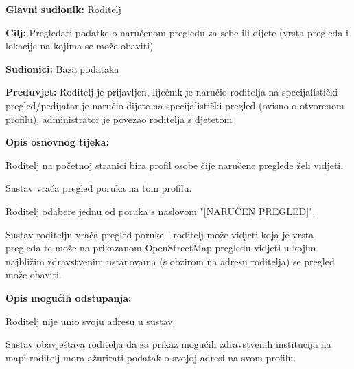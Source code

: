 					
						\noindent {}
					\begin{packed_item}
						
						\item \textbf{Glavni sudionik: }Roditelj
						\item  \textbf{Cilj:} Pregledati podatke o naručenom pregledu za sebe ili dijete (vrsta pregleda i lokacije na kojima se može obaviti)
						\item  \textbf{Sudionici:} Baza podataka
						\item  \textbf{Preduvjet:} Roditelj je prijavljen, liječnik je naručio roditelja na specijalistički pregled/pedijatar je naručio dijete na specijalistički pregled (ovisno o otvorenom profilu), administrator je povezao roditelja s djetetom
						\item  \textbf{Opis osnovnog tijeka:}
						
						\item[] \begin{packed_enum}
							
							\item Roditelj na početnoj stranici bira profil osobe čije naručene preglede želi vidjeti.
							\item Sustav vraća pregled poruka na tom profilu.
							\item Roditelj odabere jednu od poruka s naslovom "[NARUČEN PREGLED]".
							\item Sustav roditelju vraća pregled poruke - roditelj može vidjeti koja je vrsta pregleda te može na prikazanom OpenStreetMap pregledu vidjeti u kojim najbližim zdravstvenim ustanovama (s obzirom na adresu roditelja) se pregled može obaviti.
						\end{packed_enum}
						
						\item  \textbf{Opis mogućih odstupanja:}
						
						\item[] \begin{packed_item}
							
							\item[4.a] Roditelj nije unio svoju adresu u sustav.
							\item[] \begin{packed_enum}
								
								\item Sustav obavještava roditelja da za prikaz mogućih zdravstvenih institucija na mapi roditelj mora ažurirati podatak o svojoj adresi na svom profilu.
							\end{packed_enum}
							
							
						\end{packed_item}
					\end{packed_item}
					
